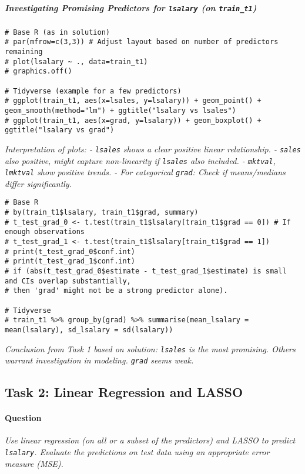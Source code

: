 \documentclass[12pt,a4paper]{article}
\newcommand{\Rcode}[1]{\texttt{#1}} %
\begin{document}
            \subparagraph{Investigating Promising Predictors for \Rcode{lsalary} (on \Rcode{train\_t1})}
\begin{lstlisting}
# Base R (as in solution)
# par(mfrow=c(3,3)) # Adjust layout based on number of predictors remaining
# plot(lsalary ~ ., data=train_t1) 
# graphics.off()

# Tidyverse (example for a few predictors)
# ggplot(train_t1, aes(x=lsales, y=lsalary)) + geom_point() + geom_smooth(method="lm") + ggtitle("lsalary vs lsales")
# ggplot(train_t1, aes(x=grad, y=lsalary)) + geom_boxplot() + ggtitle("lsalary vs grad")
\end{lstlisting}
            \textit{Interpretation of plots:
            - \Rcode{lsales} shows a clear positive linear relationship.
            - \Rcode{sales} also positive, might capture non-linearity if \Rcode{lsales} also included.
            - \Rcode{mktval}, \Rcode{lmktval} show positive trends.
            - For categorical \Rcode{grad}: Check if means/medians differ significantly.
            }
\begin{lstlisting}[caption={Statistical test for 'grad' (Task 1)}]
# Base R
# by(train_t1$lsalary, train_t1$grad, summary)
# t_test_grad_0 <- t.test(train_t1$lsalary[train_t1$grad == 0]) # If enough observations
# t_test_grad_1 <- t.test(train_t1$lsalary[train_t1$grad == 1])
# print(t_test_grad_0$conf.int)
# print(t_test_grad_1$conf.int)
# if (abs(t_test_grad_0$estimate - t_test_grad_1$estimate) is small and CIs overlap substantially,
# then 'grad' might not be a strong predictor alone).

# Tidyverse
# train_t1 %>% group_by(grad) %>% summarise(mean_lsalary = mean(lsalary), sd_lsalary = sd(lsalary))
\end{lstlisting}
            \textit{Conclusion from Task 1 based on solution: \Rcode{lsales} is the most promising. Others warrant investigation in modeling. \Rcode{grad} seems weak.}

    \subsection{Task 2: Linear Regression and LASSO}
        \paragraph{Question}
        \textit{Use linear regression (on all or a subset of the predictors) and LASSO to predict \Rcode{lsalary}. Evaluate the predictions on test data using an appropriate error measure (MSE).}
\end{document}
